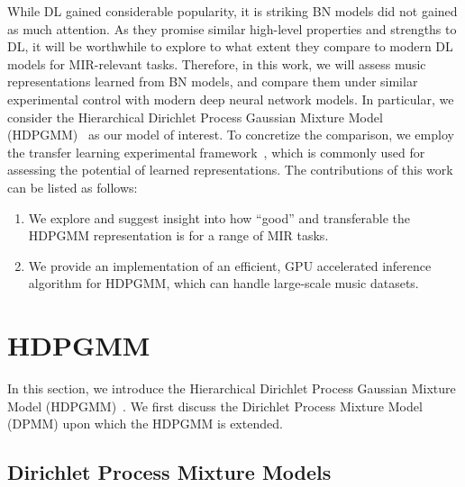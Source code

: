 \documentclass{article}
\begin{document}
While DL gained considerable popularity, it is striking BN models did not gained as much attention. As they promise similar high-level properties and strengths to DL, it will be worthwhile to explore to what extent they compare to modern DL models for MIR-relevant tasks. Therefore, in this work, we will assess music representations learned from BN models, and compare them under similar experimental control with modern deep neural network models.
In particular, we consider the Hierarchical Dirichlet Process Gaussian Mixture Model (HDPGMM)~\cite{DBLP:journals/jmlr/WangPB11,DBLP:conf/ismir/YoshiiG09,doi:10.1198/016214506000000302} as our model of interest.
To concretize the comparison, we employ the transfer learning experimental framework~\cite{DBLP:journals/nca/KimULH20, DBLP:conf/ismir/ChoiFSC17, DBLP:conf/ismir/DielemanBS11}, which is commonly used for assessing the potential of learned representations. The contributions of this work can be listed as follows:
\begin{enumerate}[noitemsep]
    \item We explore and suggest insight into how ``good'' and transferable the HDPGMM representation is for a range of MIR tasks.
    \item We provide an implementation of an efficient, GPU accelerated inference algorithm for HDPGMM, which can handle large-scale music datasets.
\end{enumerate}


\section{HDPGMM}\label{sec:hdpgmm}

In this section, we introduce the Hierarchical Dirichlet Process Gaussian Mixture Model (HDPGMM)~\cite{DBLP:conf/ismir/HoffmanBC08, doi:10.1198/016214506000000302}. We first discuss the Dirichlet Process Mixture Model (DPMM) upon which the HDPGMM is extended.

\subsection{Dirichlet Process Mixture Models}\label{sec:hdpgmm:dpmm}
\end{document}
